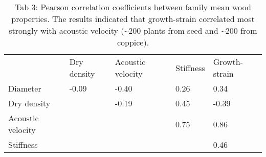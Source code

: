 \begin{table}
\centering
\caption{Tab 3: Pearson correlation coefficients between family mean wood properties. The results indicated that growth-strain correlated most strongly with acoustic velocity (\sim 200 plants from seed and \sim 200 from coppice).}
\label{my-label}
\begin{tabular}{lllll}
                  & Dry density       & Acoustic velocity & Stiffness & Growth-strain        \\
Diameter          & -0.09             & -0.40     & 0.26          & 0.34  \\
Dry density       &                   & -0.19     & 0.45          & -0.39 \\
Acoustic velocity &                   &           & 0.75          & 0.86  \\
Stiffness         &                   &           &               & 0.46 
\end{tabular}
\end{table}